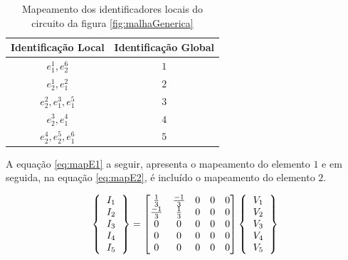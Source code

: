\documentclass[
    12pt,               %
    openright,          %
    oneside,
    a4paper,            %
    english,            %
    french,             %
    spanish,            %
    brazil              %
    ]{abntex2}
\begin{document}
\begin{apendicesenv}
\begin{table} 
	\centering
	\begin{tabular}{|c|c|}  
		\hline
		\textbf{Identificação Local} 
		& \textbf{Identificação Global} \\  
		\hline
		$e_1^1, e_2^6$ 
		& $1$ \\
		\hline
		$e_2^1, e_1^2$
		& $2$  \\
		\hline
		$e_2^2, e_1^3, e_1^5$
		& $3$ \\
		\hline
		$e_2^3, e_1^4$
		& $4$  \\
		\hline
		$e_2^4, e_2^5, e_1^6$
		& $5$  \\        
		\hline
	\end{tabular}
	\caption{Mapeamento dos identificadores locais do circuito da figura \ref{fig:malhaGenerica}}
	\label{tab:mapLG}
\end{table}

A equação \ref{eq:mapE1} a seguir, apresenta o mapeamento do elemento $1$ e em seguida, na equação \ref{eq:mapE2}, é incluído o mapeamento do elemento $2$.  

\begin{equation}
\label{eq:mapE1}
\left \{
\begin{tabular}{c}
$I_1$ \\
$I_2$ \\
$I_3$ \\
$I_4$ \\
$I_5$          
\end{tabular}       
\right \}
=
\begin{bmatrix}
\frac{1}{3} & \frac{-1}{3}  & 0 & 0 & 0 \\
\frac{-1}{3} & \frac{1}{3}  & 0 & 0 & 0 \\
0 & 0 & 0 & 0 & 0 \\
0 & 0 & 0 & 0 & 0 \\
0 & 0 & 0 & 0 & 0 \\
\end{bmatrix} 
\left \{
\begin{tabular}{c}
$V_1$ \\
$V_2$ \\
$V_3$ \\
$V_4$ \\
$V_5$          
\end{tabular}       
\right \}	                     
\end{equation}


\end{apendicesenv}
\end{document}
